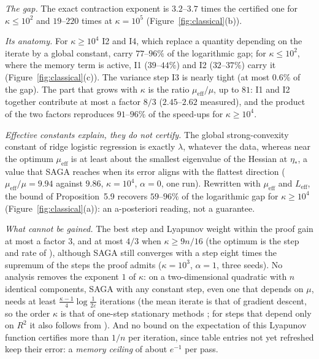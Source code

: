 \documentclass[10pt]{article}
\newcommand{\etas}{\eta_\ast}
\newcommand{\muEff}{\mu_{\mathrm{eff}}}
\newcommand{\LEff}{L_{\mathrm{eff}}}
\begin{document}
\begin{description}[leftmargin=2.3em,labelwidth=2.0em,labelsep=0.3em,itemsep=1pt,topsep=3pt,parsep=0pt,font=\normalfont\bfseries]
\item[(C1)] \emph{The gap.} The exact contraction exponent is $3.2$--$3.7$ times the certified one for
$\kappa\le10^2$ and $19$--$220$ times at $\kappa=10^5$ (Figure~\ref{fig:classical}(b)).

\item[(C2)] \emph{Its anatomy.} For $\kappa\ge10^4$ I2 and I4, which replace a quantity depending on the iterate by a
global constant, carry $77$--$96\%$ of
the logarithmic gap; for $\kappa\le10^2$, where the memory term is active, I1 ($39$--$44\%$) and
I2 ($32$--$37\%$) carry it (Figure~\ref{fig:classical}(c)). The variance step I3 is nearly tight (at most $0.6\%$ of the
gap). The part that grows with $\kappa$ is the ratio $\muEff/\mu$, up to $81$: I1 and I2 together contribute at most a
factor $8/3$ ($2.45$--$2.62$ measured), and the product of the two factors reproduces $91$--$96\%$ of the speed-ups
for $\kappa\ge10^4$.

\item[(C3)] \emph{Effective constants explain, they do not certify.} The global strong-convexity constant of ridge
logistic regression is exactly $\lambda$, whatever the data, whereas near the optimum $\muEff$ is at least about the
smallest eigenvalue of the Hessian at $\etas$, a value that SAGA reaches when its error aligns with the flattest
direction ($\muEff/\mu=9.94$ against $9.86$, $\kappa=10^4$, $\alpha=0$, one run). Rewritten with $\muEff$ and
$\LEff$, the bound of Proposition~5.9 recovers $59$--$96\%$ of the logarithmic gap for $\kappa\ge10^4$
(Figure~\ref{fig:classical}(a)): an a-posteriori reading, not a guarantee.

\item[(C4)] \emph{What cannot be gained.} The best step and Lyapunov weight within the proof gain at most a factor
$3$, and at most $4/3$ when $\kappa\ge9n/16$ (the optimum is the step and rate of \cite{hofmann2015variance}),
although SAGA still converges with a step eight times the supremum of the steps the proof admits ($\kappa=10^3$, $\alpha=1$,
three seeds). No analysis removes the
exponent $1$ of $\kappa$: on a two-dimensional quadratic with $n$ identical components, SAGA with any constant step,
even one that depends on $\mu$, needs at least $\frac{\kappa-1}4\log\frac1{2\varepsilon}$ iterations (the mean iterate is
that of gradient descent, so the order $\kappa$ is that of one-step stationary methods \cite[Theorem~8]{arjevani2016lower};
for steps that depend only on $R^2$ it also follows from \cite{arjevani2016iteration}). And no bound on the expectation of
this Lyapunov function certifies more than $1/n$ per iteration, since table entries not yet refreshed keep their
error: a \emph{memory ceiling} of about $e^{-1}$ per pass.


\end{description}
\end{document}
